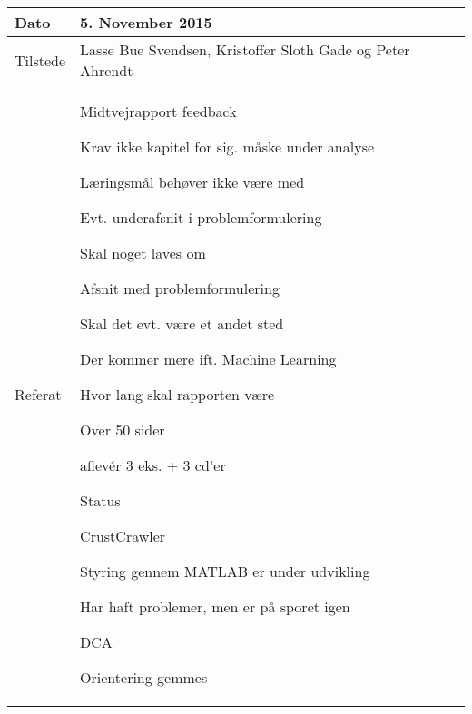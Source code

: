 \begin{center}
	\begin{tabular}{| l | p{10cm} |}
		\hline
		Dato		& 5. November 2015\\ \hline
		Tilstede 	& Lasse Bue Svendsen, Kristoffer Sloth Gade og Peter Ahrendt\\ \hline
		Referat		& \vspace{-5mm}\begin{myEnumerate}
			\item Midtvejrapport feedback
			\begin{myItemize}				
				\item Krav ikke kapitel for sig. måske under analyse
				\item Læringsmål behøver ikke være med
				\begin{myItemize}
					\item Evt. underafsnit i problemformulering
				\end{myItemize}
				\item Skal noget laves om
				\begin{myItemize}
					\item Afsnit med problemformulering
					\begin{myItemize}
						\item Skal det evt. være et andet sted
					\end{myItemize}
					\item Der kommer mere ift. Machine Learning
				\end{myItemize}
				\item Hvor lang skal rapporten være
				\begin{myItemize}
					\item Over 50 sider
					\item aflevér 3 eks. + 3 cd'er
				\end{myItemize}
			\end{myItemize}
			\item Status
			\begin{myItemize}
				\item CrustCrawler
				\begin{myItemize}
					\item Styring gennem MATLAB er under udvikling
					\item Har haft problemer, men er på sporet igen
				\end{myItemize}
				\item DCA
				\begin{myItemize}
					\item Orientering gemmes

\end{myItemize}
\end{myItemize}
\end{myEnumerate}
\end{tabular}
\end{center}
